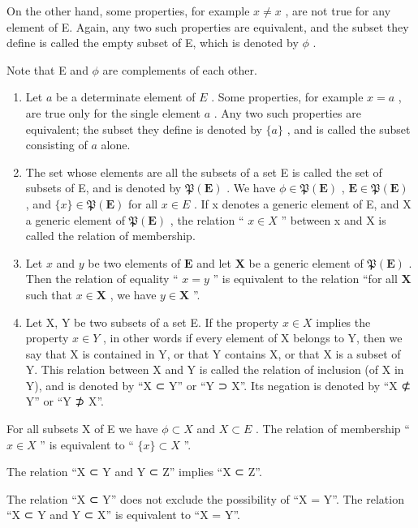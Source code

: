 On the other hand, some properties, for example \(x \neq x\) , are not true for any element of E. Again, any two such properties are equivalent, and the subset they define is called the empty subset of E, which is denoted by \(\phi\) .

Note that E and \(\phi\) are complements of each other.

\begin{enumerate}
\def\labelenumi{\arabic{enumi}.}
\setcounter{enumi}{8}
\item
  Let \(a\) be a determinate element of \(E\) . Some properties, for example \(x = a\) , are true only for the single element \(a\) . Any two such properties are equivalent; the subset they define is denoted by \(\{a\}\) , and is called the subset consisting of \(a\) alone.
\item
  The set whose elements are all the subsets of a set E is called the set of subsets of E, and is denoted by \(\mathfrak{P}(\mathbf{E})\) . We have \(\phi \in \mathfrak{P}(\mathbf{E})\) , \(\mathbf{E} \in \mathfrak{P}(\mathbf{E})\) , and \(\{x\} \in \mathfrak{P}(\mathbf{E})\) for all \(x \in E\) . If x denotes a generic element of E, and X a generic element of \(\mathfrak{P}(\mathbf{E})\) , the relation `` \(x \in X\) '' between x and X is called the relation of membership.
\item
  Let \(x\) and \(y\) be two elements of \(\mathbf{E}\) and let \(\mathbf{X}\) be a generic element of \(\mathfrak{P}(\mathbf{E})\) . Then the relation of equality `` \(x = y\) '' is equivalent to the relation ``for all \(\mathbf{X}\) such that \(x \in \mathbf{X}\) , we have \(y \in \mathbf{X}\) ''.
\item
  Let X, Y be two subsets of a set E. If the property \(x \in X\) implies the property \(x \in Y\) , in other words if every element of X belongs to Y, then we say that X is contained in Y, or that Y contains X, or that X is a subset of Y. This relation between X and Y is called the relation of inclusion (of X in Y), and is denoted by ``X ⊂ Y'' or ``Y ⊃ X''. Its negation is denoted by ``X ⊄ Y'' or ``Y ⊅ X''.
\end{enumerate}

For all subsets X of E we have \(\phi \subset X\) and \(X \subset E\) . The relation of membership `` \(x \in X\) '' is equivalent to `` \(\{x\} \subset X\) ''.

The relation ``X ⊂ Y and Y ⊂ Z'' implies ``X ⊂ Z''.

The relation ``X ⊂ Y'' does not exclude the possibility of ``X = Y''. The relation ``X ⊂ Y and Y ⊂ X'' is equivalent to ``X = Y''.

